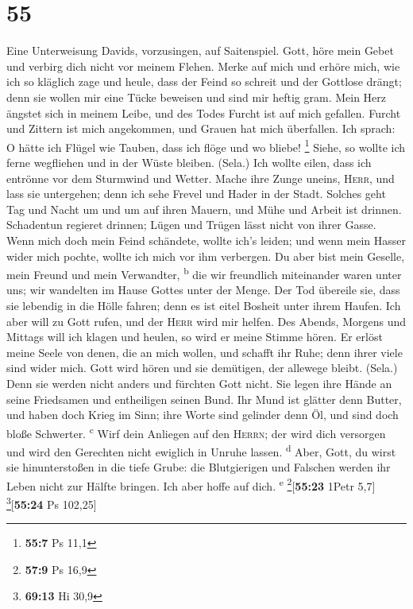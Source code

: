 \hypertarget{section-54}{%
\section{55}\label{section-54}}

 Eine Unterweisung Davids, vorzusingen, auf Saitenspiel.
 Gott, höre mein Gebet und verbirg dich nicht vor meinem
Flehen.  Merke auf mich und erhöre mich, wie ich so
kläglich zage und heule,  dass der Feind so schreit und
der Gottlose drängt; denn sie wollen mir eine Tücke beweisen und sind
mir heftig gram.  Mein Herz ängstet sich in meinem Leibe,
und des Todes Furcht ist auf mich gefallen.  Furcht und
Zittern ist mich angekommen, und Grauen hat mich überfallen.
 Ich sprach: O hätte ich Flügel wie Tauben, dass ich flöge
und wo bliebe! \footnote{\textbf{55:7} Ps 11,1}  Siehe, so
wollte ich ferne wegfliehen und in der Wüste bleiben. (Sela.)
 Ich wollte eilen, dass ich entrönne vor dem Sturmwind und
Wetter.  Mache ihre Zunge uneins, \textsc{Herr}, und lass
sie untergehen; denn ich sehe Frevel und Hader in der Stadt.
 Solches geht Tag und Nacht um und um auf ihren Mauern,
und Mühe und Arbeit ist drinnen.  Schadentun regieret
drinnen; Lügen und Trügen lässt nicht von ihrer Gasse. 
Wenn mich doch mein Feind schändete, wollte ich's leiden; und wenn mein
Hasser wider mich pochte, wollte ich mich vor ihm verbergen.
 Du aber bist mein Geselle, mein Freund und mein
Verwandter, \textsuperscript{b}  die wir freundlich
miteinander waren unter uns; wir wandelten im Hause Gottes unter der
Menge.  Der Tod übereile sie, dass sie lebendig in die
Hölle fahren; denn es ist eitel Bosheit unter ihrem Haufen.
 Ich aber will zu Gott rufen, und der \textsc{Herr} wird
mir helfen.  Des Abends, Morgens und Mittags will ich
klagen und heulen, so wird er meine Stimme hören.  Er
erlöst meine Seele von denen, die an mich wollen, und schafft ihr Ruhe;
denn ihrer viele sind wider mich.  Gott wird hören und
sie demütigen, der allewege bleibt. (Sela.) Denn sie werden nicht anders
und fürchten Gott nicht.  Sie legen ihre Hände an seine
Friedsamen und entheiligen seinen Bund.  Ihr Mund ist
glätter denn Butter, und haben doch Krieg im Sinn; ihre Worte sind
gelinder denn Öl, und sind doch bloße Schwerter. \textsuperscript{c}
 Wirf dein Anliegen auf den \textsc{Herrn}; der wird dich
versorgen und wird den Gerechten nicht ewiglich in Unruhe lassen.
\textsuperscript{d}  Aber, Gott, du wirst sie
hinunterstoßen in die tiefe Grube: die Blutgierigen und Falschen werden
ihr Leben nicht zur Hälfte bringen. Ich aber hoffe auf dich.
\textsuperscript{e} \footnote{\textbf{57:9} Ps 16,9}{[}\textbf{55:23}
1Petr 5,7{]} \footnote{\textbf{69:13} Hi 30,9}{[}\textbf{55:24} Ps
102,25{]}

